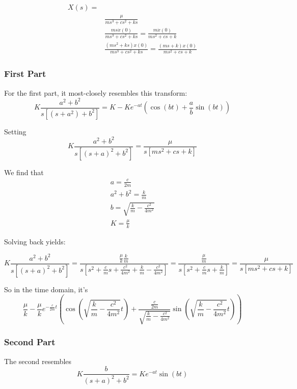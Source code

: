 \documentclass{article}
\begin{document}
\begin{align*}
    X(s) = & \\
    & \frac{\mu}{ms^3 + cs^2 + ks} \\
    & \frac{ms \dot{x}(0)}{ms^3 + cs^2 + ks} = \frac{m \dot{x}(0)}{ms^2 + cs + k} \\
    & \frac{(ms^2 + ks)x(0)}{ms^3 + cs^2 + ks} = \frac{(ms + k)x(0)}{ms^2 + cs + k}
\end{align*}


\subsubsection{First Part}
For the first part, it most-closely resembles this transform:
\begin{equation*}
    K\frac{a^2 + b^2}{s[(s+a^2) + b^2]} = K - Ke^{-at}(\cos(bt) + \frac{a}{b}\sin(bt))
\end{equation*}

Setting
\begin{equation*}
    K\frac{a^2 + b^2}{s[(s+a)^2 + b^2]} = \frac{\mu}{s[ms^2 + cs + k]}
\end{equation*}

We find that 
\begin{gather*}
    a = \frac{c}{2m} \\
    a^2 + b^2 = \frac{k}{m} \\
    b = \sqrt{\frac{k}{m} - \frac{c^2}{4m^2}} \\
    K = \frac{\mu}{k}
\end{gather*}

Solving back yields:

\begin{equation*}
    K\frac{a^2 + b^2}{s[(s+a)^2 + b^2]} = \frac{\frac{\mu}{k} \frac{k}{m}}{s[s^2 + \frac{c}{m}s + \frac{c^2}{4m^2} + \frac{k}{m} - \frac{c^2}{4m^2}]} = \frac{\frac{\mu}{m}}{s[s^2 + \frac{c}{m}s + \frac{k}{m}]} = \frac{\mu}{s[ms^2 + cs + k]}
\end{equation*}

So in the time domain, it's 
\begin{equation*}
    \frac{\mu}{k} - \frac{\mu}{k}e^{-\frac{c}{2m}t}(\cos(\sqrt{\frac{k}{m} - \frac{c^2}{4m^2}}t) + \frac{\frac{c}{2m}}{\sqrt{\frac{k}{m} - \frac{c^2}{4m^2}}}\sin(\sqrt{\frac{k}{m} - \frac{c^2}{4m^2}}t))
\end{equation*}

\subsubsection{Second Part}
The second resembles
\begin{equation*}
    K\frac{b}{(s+a)^2 + b^2} = Ke^{-at}\sin(bt)
\end{equation*}
\end{document}
